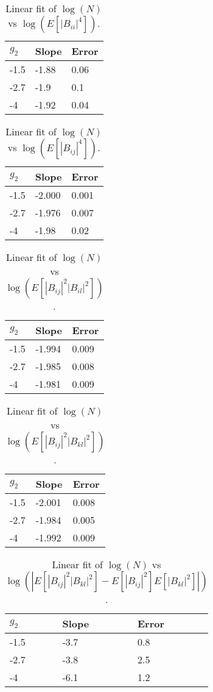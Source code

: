 \documentclass[12pt,a4paper]{article}
\begin{document}
\begin{table}[hp]
\centering
\begin{tabular}{|l|l|l|}
\hline
$g_2$ & Slope & Error \\ \hline
-1.5 & -1.88 & 0.06 \\ \hline
-2.7 & -1.9 & 0.1 \\ \hline
-4 & -1.92 & 0.04 \\ \hline
\end{tabular}
\caption{Linear fit of $\log(N)$ vs $\log(E[ |B_{ii}|^4 ])$.}
\label{tab:NB4iiexp}
\end{table}
\begin{table}[hp]
\centering
\begin{tabular}{|l|l|l|}
\hline
$g_2$ & Slope & Error \\ \hline
-1.5 & -2.000 & 0.001 \\ \hline
-2.7 & -1.976 & 0.007 \\ \hline
-4 & -1.98 & 0.02 \\ \hline
\end{tabular}
\caption{Linear fit of $\log(N)$ vs $\log(E[ |B_{ij}|^4 ])$.}
\label{tab:NB4ijexp}
\end{table}
\newpage
\begin{table}[hp]
\centering
\begin{tabular}{|l|l|l|}
\hline
$g_2$ & Slope & Error \\ \hline
-1.5 & -1.994 & 0.009 \\ \hline
-2.7 & -1.985 & 0.008 \\ \hline
-4 & -1.981 & 0.009 \\ \hline
\end{tabular}
\caption{Linear fit of $\log(N)$ vs $\log(E[ |B_{ij}|^2  |B_{il}|^2   ])$.}
\label{tab:NBijil}
\end{table}
\begin{table}[hp]
\centering
\begin{tabular}{|l|l|l|}
\hline
$g_2$ & Slope & Error \\ \hline
-1.5 & -2.001 & 0.008 \\ \hline
-2.7 & -1.984 & 0.005 \\ \hline
-4 & -1.992 & 0.009 \\ \hline
\end{tabular}
\caption{Linear fit of $\log(N)$ vs $\log(E[ |B_{ij}|^2  |B_{kl}|^2   ])$.}
\label{tab:NBijkl}
\end{table}
\begin{table}[hp]
\centering
\begin{tabular}{|l|l|l|}
\hline
$g_2$ & Slope & Error \\ \hline
-1.5 & -3.7 & 0.8 \\ \hline
-2.7 & -3.8 & 2.5 \\ \hline
-4 & -6.1 & 1.2 \\ \hline
\end{tabular}
\caption{Linear fit of $\log(N)$ vs $\log(|E[ |B_{ij}|^2  |B_{kl}|^2 ] - E[ |B_{ij}|^2 ] E[ |B_{kl}|^2 ]|)$.}
\label{tab:NBstatind}
\end{table}
\end{document}
